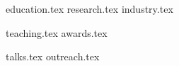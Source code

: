 \documentclass[letterpaper,11pt]{article}
\begin{document}


{education.tex}
{research.tex}
{industry.tex}

\pagebreak

\sidebyside
    { {teaching.tex}}
    {{awards.tex}}

\vspace{15px}

\sidebyside
    {{talks.tex}}
    {{outreach.tex}}
\end{document}

